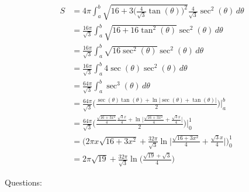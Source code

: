 \documentclass[16pt]{article}
\theoremstyle{remark}
\begin{document}
\begin{enumerate}
\begin{mdframed}[style=TheoremFrame]
\begin{align*}
S&= 4\pi \int_a^b \sqrt{16+3\bigg(\frac{4}{\sqrt{3}}\tan(\theta)\bigg)^2}\frac{4}{\sqrt{3}} \sec^2(\theta)\, d\theta\\[1.1ex]
&= \frac{16\pi}{\sqrt{3}} \int_a^b \sqrt{16+16\tan^2(\theta)} \sec^2(\theta) \, d\theta\\[1.1ex]
&= \frac{16\pi}{\sqrt{3}} \int_a^b \sqrt{16\sec^2(\theta)} \sec^2(\theta) \, d\theta\\[1.1ex]
&= \frac{16\pi}{\sqrt{3}} \int_a^b 4\sec(\theta) \sec^2(\theta) \, d\theta\\[1.1ex]
&= \frac{64\pi}{\sqrt{3}}\int_a^b  \sec^3(\theta) \, d\theta\\[1.1ex]
&= \frac{64\pi}{\sqrt{3}} \bigg(\frac{\sec(\theta)\tan(\theta) + \ln\big|\sec(\theta)+\tan(\theta)\big|}{2}\bigg) \bigg|_a^b\\[1.1ex]
&= \frac{64\pi}{\sqrt{3}} \bigg(\frac{\frac{\sqrt{16+3x^2}}{4}\frac{\sqrt{3}x}{4} + \ln\big|\frac{\sqrt{16+3x^2}}{4}+\frac{\sqrt{3}x}{4}\big|}{2}\bigg) \bigg|_0^1\\[1.1ex]
&= \bigg(2\pi x \sqrt{16+3x^2} + \frac{32\pi}{\sqrt{3}} \ln\big|\frac{\sqrt{16+3x^2}}{4}+\frac{\sqrt{3}x}{4}\big|\bigg)_0^1\\[1.1ex]
&= 2\pi \sqrt{19} + \frac{32\pi}{\sqrt{3}} \ln\bigg(\frac{\sqrt{19}+\sqrt{3}}{4}\bigg) 
\end{align*}
\end{mdframed}
\end{enumerate}
\newpage
Questions:
\end{document}
